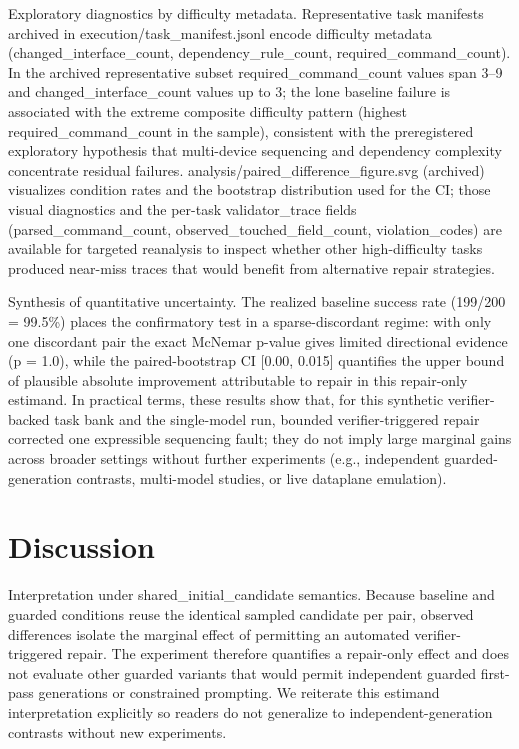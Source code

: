 \documentclass[conference]{IEEEtran}
\begin{document}
Exploratory diagnostics by difficulty metadata. Representative task manifests archived in execution/task\_manifest.jsonl encode difficulty metadata (changed\_interface\_count, dependency\_rule\_count, required\_command\_count). In the archived representative subset required\_command\_count values span 3--9 and changed\_interface\_count values up to 3; the lone baseline failure is associated with the extreme composite difficulty pattern (highest required\_command\_count in the sample), consistent with the preregistered exploratory hypothesis that multi-device sequencing and dependency complexity concentrate residual failures. analysis/paired\_difference\_figure.svg (archived) visualizes condition rates and the bootstrap distribution used for the CI; those visual diagnostics and the per-task validator\_trace fields (parsed\_command\_count, observed\_touched\_field\_count, violation\_codes) are available for targeted reanalysis to inspect whether other high-difficulty tasks produced near-miss traces that would benefit from alternative repair strategies.

Synthesis of quantitative uncertainty. The realized baseline success rate (199/200 = 99.5\%) places the confirmatory test in a sparse-discordant regime: with only one discordant pair the exact McNemar p-value gives limited directional evidence (p = 1.0), while the paired-bootstrap CI [0.00, 0.015] quantifies the upper bound of plausible absolute improvement attributable to repair in this repair-only estimand. In practical terms, these results show that, for this synthetic verifier-backed task bank and the single-model run, bounded verifier-triggered repair corrected one expressible sequencing fault; they do not imply large marginal gains across broader settings without further experiments (e.g., independent guarded-generation contrasts, multi-model studies, or live dataplane emulation).

\section{Discussion}
Interpretation under shared\_initial\_candidate semantics. Because baseline and guarded conditions reuse the identical sampled candidate per pair, observed differences isolate the marginal effect of permitting an automated verifier-triggered repair. The experiment therefore quantifies a repair-only effect and does not evaluate other guarded variants that would permit independent guarded first-pass generations or constrained prompting. We reiterate this estimand interpretation explicitly so readers do not generalize to independent-generation contrasts without new experiments.
\end{document}
